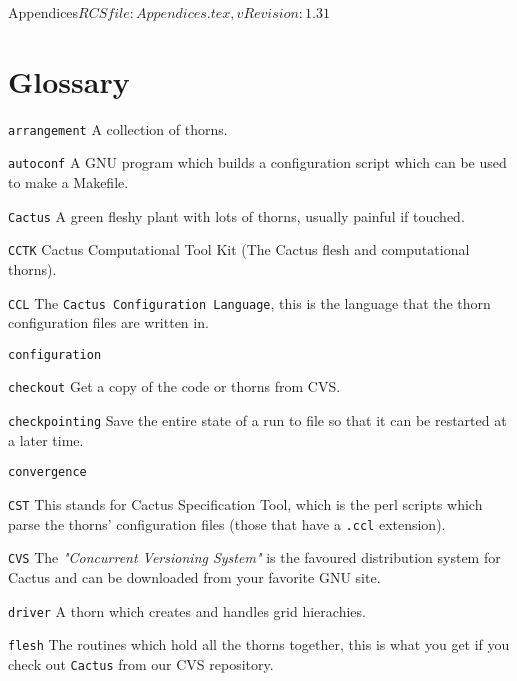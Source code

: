 \begin{cactuspart}{6}{Appendices}{$RCSfile: Appendices.tex,v $}{$Revision: 1.31 $}
\renewcommand{\thepage}{\Alph{part}\arabic{page}}

\chapter{Glossary}
\label{sec:glossary}

\begin{Lentry}

\item[{\tt arrangement}] A collection of thorns.
\item[{\tt autoconf}] A GNU program which builds a configuration
   script which can be used to make a Makefile.
\item[{\tt Cactus}] A green fleshy plant with lots of thorns, usually painful if touched.
\item[{\tt CCTK}] Cactus Computational Tool Kit (The Cactus flesh and
            computational thorns).
\item[{\tt CCL}] The {\tt Cactus Configuration Language}, this is the language
that the thorn configuration files are written in.
\item[{\tt configuration}]
\item[{\tt checkout}] Get a copy of the code or thorns from CVS.
\item[{\tt checkpointing}] Save the entire state of a run to file so that it can be restarted at a later time.
\item[{\tt convergence}]
\item[{\tt CST}] This stands for Cactus Specification Tool, which is
the perl scripts which parse the thorns' configuration files (those
that have a \texttt{.ccl} extension).
\item[{\tt CVS}] The {\em "Concurrent Versioning System"} is the
  favoured distribution system for Cactus and can be
  downloaded from your favorite GNU site.
\item[{\tt driver}] A thorn which creates and handles grid hierachies.
\item[{\tt flesh}] The routines which hold all the thorns together, this
is what you get if you check out {\tt Cactus} from our CVS repository.

\end{Lentry}
\end{cactuspart}
